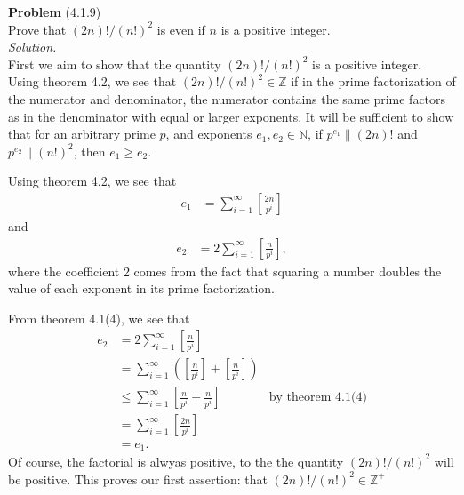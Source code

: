 \documentclass[12 pt]{amsart}
\begin{document}
\phantom{\quad} \vfill
\noindent
\textbf{Problem} (4.1.9) \\[4ex]
  Prove that $(2n)!/(n!)^2$ is even if $n$ is a positive integer.
  \\[2ex]
\emph{Solution.} \\[2ex]
  First we aim to show that the quantity $(2n)!/(n!)^2$ is a positive integer.
  Using theorem 4.2, we see that $(2n)!/(n!)^2 \in \mathbb{Z}$ if
  in the prime factorization of the numerator and denominator,
  the numerator contains the same prime factors as in the denominator
  with equal or larger exponents. 
  It will be sufficient to show that for an arbitrary prime $p$, 
  and exponents $e_1, e_2 \in \mathbb{N}$,
  if $p^{e_1} \parallel (2n)!$ and $p^{e_2} \parallel (n!)^2$,
  then $e_1 \geq e_2$.

  Using theorem 4.2, we see that 
  \begin{align*}
    e_1 &= \sum_{i = 1}^{\infty} \left[ \frac{2n}{p^i} \right]
  \end{align*}
  and 
  \begin{align*}
    e_2 &= 2 \sum_{i = 1}^{\infty} \left[ \frac{n}{p^i} \right],
  \end{align*}
  where the coefficient 2 comes from the fact that squaring
  a number doubles the value of each exponent in its prime factorization.

  From theorem 4.1(4), we see that 
  \begin{align*}
    e_2 &=  2 \sum_{i = 1}^{\infty} \left[ \frac{n}{p^i} \right] \\
        &= \sum_{i = 1}^{\infty} 
            \left( 
              \left[ \frac{n}{p^i} \right] 
              + \left[ \frac{n}{p^i} \right] 
            \right)\\
        &\leq \sum_{i = 1}^{\infty}  
                    \left[ \frac{n}{p^i} + \frac{n}{p^i} \right]  
                    & \text{by theorem 4.1(4)}\\
        &= \sum_{i = 1}^{\infty} \left[ \frac{2n}{p^i} \right] \\
        &= e_1.
  \end{align*}
  Of course, the factorial is alwyas positive, to the the quantity
  $(2n)!/(n!)^2$ will be positive.
  This proves our first assertion: that $(2n)!/(n!)^2 \in \mathbb{Z}^+$
\end{document}
